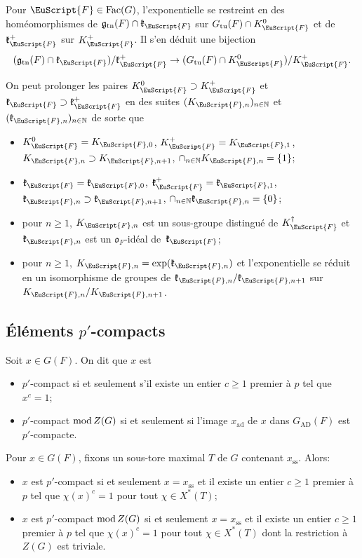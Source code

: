 \documentclass[JEP,XML,SOM,Unicode,francais]{cedram}
\let\mathcal \EuScript
\newcommand{\rmod}{\textup{mod}\,}
\newcommand{\frg}{\mathfrak{g}}
\newcommand{\frk}{\mathfrak{k}}
\newcommand{\fro}{\mathfrak{o}}
\newcommand{\AD}{\mathrm{AD}}
\newcommand{\Fac}{\mathrm{Fac}}
\newcommand{\rss}{\mathrm{ss}}
\newcommand{\tn}{\mathrm{tn}}
\newcommand{\tu}{\mathrm{tu}}
\DeclareMathOperator{\ad}{ad}
\newcommand{\cF}{\mathcal{F}}
\newcommand{\NN}{\mathbb{N}}
\theoremstyle{plain}
\theoremstyle{definition}
\begin{document}
Pour $\cF\in \Fac(G)$, l'exponentielle se restreint en des homéomorphismes de \hbox{$\frg_{\tn}(F)\cap \frk_{\cF}$} sur $G_{\tu}(F)\cap K_{\cF}^0$
et de $\frk_{\cF}^+$ sur $K_{\cF}^+$. Il s'en déduit une bijection
\[
(\frg_{\tn}(F)\cap \frk_{\cF})/\frk_{\cF}^+\to (G_{\tu}(F)\cap K_{\cF}^0)/K_{\cF}^+.
\]

On peut prolonger les paires $K_{\cF}^0\supset K_{\cF}^+$ et $\frk_{\cF}\supset \frk_{\cF}^+$
en des suites $(K_{\cF,n})_{n\in \NN}$ et $(\frk_{\cF,n})_{n\in \NN}$ de sorte que
\begin{itemize}
\item
$K_{\cF}^0=K_{\cF,0}$, $K_{\cF}^+ =K_{\cF,1}$, $K_{\cF,n}\supset K_{\cF,n+1}$, $\cap_{n\in \NN}K_{\cF,n}=\{1\}$;

\item
$\frk_{\cF}=\frk_{\cF,0}$, $\frk_{\cF}^+ =\frk_{\cF,1}$, $\frk_{\cF,n}\supset \frk_{\cF,n+1}$, $\cap_{n\in \NN}\frk_{\cF,n}=\{0\}$;

\item
pour $n\!\geq\!1$, $K_{\cF,n}$ est un sous-groupe distingué de $K_{\cF}^{\dag}$ et $\frk_{\cF,n}$ est un $\fro_{F}$-idéal de~$\frk_{\cF}$;

\item
pour $n\geq1$, $K_{\cF,n}=\exp(\frk_{\cF,n})$ et l'exponentielle se réduit en un isomorphisme de groupes de $\frk_{\cF,n}/\frk_{\cF,n+1}$ sur $K_{\cF,n}/K_{\cF,n+1}$.
\end{itemize}

\subsection{Éléments \texorpdfstring{$p'$}{p'}-compacts}\label{elementsp}

Soit $x\in G(F)$. On dit que $x$ est
\begin{itemize}
\item
$p'$-compact si et seulement s'il existe un entier $c\geq1$ premier à $p$ tel que $x^c=1$;

\item
$p'$-compact $\rmod Z(G)$ si et seulement si l'image $x_{\ad}$ de $x$ dans $G_{\AD}(F)$ est $p'$-compacte.
\end{itemize}

Pour $x\in G(F)$, fixons un sous-tore maximal $T$ de $G$ contenant $x_{\rss}$. Alors:

\begin{itemize}
\item
$x$ est $p'$-compact si et seulement $x=x_{\rss}$ et il existe un entier $c\geq1$ premier à $p$ tel que $\chi(x)^c=1$ pour tout $\chi\in X^*(T)$;

\item
$x$ est $p'$-compact $\rmod Z(G)$ si et seulement $x=x_{\rss}$ et il existe un entier $c\geq1$ premier à $p$ tel que $\chi(x)^c=1$ pour tout $\chi\in X^*(T)$ dont la restriction à $Z(G)$ est triviale.
\end{itemize}
\end{document}
